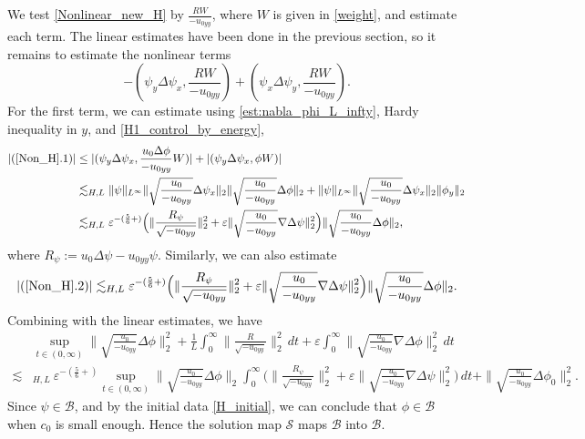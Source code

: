 \documentclass[reqno, 11pt]{amsart}
\theoremstyle{plain}
\theoremstyle{definition}
\theoremstyle{remark}
\numberwithin{equation}{section}
\newcommand\cB{\mathcal{B}}
\newcommand\cS{\mathcal{S}}
\begin{document}
We test \eqref{Nonlinear_new_H} by $\frac{RW}{-u_{0yy}}$, where $W$ is given in \eqref{weight}, and estimate each term. The linear estimates have been done in the previous section, so it remains to estimate the nonlinear terms
\begin{equation}\label{Non_H}
-(\psi_y \Delta \psi_x, \frac{RW}{-u_{0yy}}) + (\psi_x \Delta \psi_y, \frac{RW}{-u_{0yy}}).
\end{equation}
For the first term, we can estimate using \eqref{est:nabla_phi_L_infty}, Hardy inequality in $y$, and \eqref{H1_control_by_energy},
\begin{equation}\label{Non_H_1}
\begin{aligned}
|(\ref{Non_H}.1)| &\le |(\psi_y \Delta \psi_x, \frac{u_0 \Delta \phi}{-u_{0yy}}W)| + |(\psi_y \Delta \psi_x, \phi W)|\\
&\lesssim_{H,L} \| \psi \|_{L^\infty} \| \sqrt{\frac{u_0}{-u_{0yy}}} \Delta \psi_x\|_2 \| \sqrt{\frac{u_0}{-u_{0yy}}} \Delta \phi\|_2  + \| \psi \|_{L^\infty} \| \sqrt{\frac{u_0}{-u_{0yy}}} \Delta \psi_x\|_2 \| \phi_y\|_2\\
&\lesssim_{H,L} \varepsilon^{-(\frac{5}{6}+)} \Big( \|\frac{R_\psi}{\sqrt{-u_{0yy}}}\|_{2}^2  + \varepsilon \| \sqrt{\frac{u_0}{-u_{0yy}}} \nabla\Delta \psi\|_{2}^2 \Big) \| \sqrt{\frac{u_0}{-u_{0yy}}} \Delta \phi\|_2,
\end{aligned}
\end{equation}
where $R_\psi := u_0 \Delta \psi - u_{0yy} \psi$. Similarly, we can also estimate
\begin{equation}\label{Non_H_2}
\begin{aligned}
|(\ref{Non_H}.2)|\lesssim_{H,L} \varepsilon^{-(\frac{5}{6}+)} \Big( \|\frac{R_\psi}{\sqrt{-u_{0yy}}}\|_{2}^2  + \varepsilon \| \sqrt{\frac{u_0}{-u_{0yy}}} \nabla\Delta \psi\|_{2}^2 \Big) \| \sqrt{\frac{u_0}{-u_{0yy}}} \Delta \phi\|_2.
\end{aligned}
\end{equation}
Combining with the linear estimates, we have
\begin{align*}
&\sup_{t \in (0,\infty)} \|\sqrt{\frac{u_0}{-u_{0yy}}} \Delta \phi\|_{2}^2 + \frac{1}{L} \int_0^\infty \|\frac{R}{\sqrt{-u_{0yy}}}\|_{2}^2 \, dt + \varepsilon \int_0^\infty  \| \sqrt{\frac{u_0}{-u_{0yy}}} \nabla \Delta \phi \|_{2}^2 \, dt\\
\lesssim&_{H,L}~ \varepsilon^{-(\frac{5}{6}+)} \sup_{t \in (0,\infty)} \| \sqrt{\frac{u_0}{-u_{0yy}}} \Delta \phi\|_2 \int_0^\infty \Big( \|\frac{R_\psi}{\sqrt{-u_{0yy}}}\|_{2}^2  + \varepsilon \| \sqrt{\frac{u_0}{-u_{0yy}}} \nabla\Delta \psi\|_{2}^2 \Big) \, dt + \| \sqrt{\frac{u_0}{-u_{0yy}}} \Delta \phi_0\|_2^2.
\end{align*}
Since $\psi \in \cB$, and by the initial data \eqref{H_initial}, we can conclude that $\phi \in \cB$ when $c_0$ is small enough. Hence the solution map $\cS$ maps $\cB$ into $\cB$. 
\end{document}
